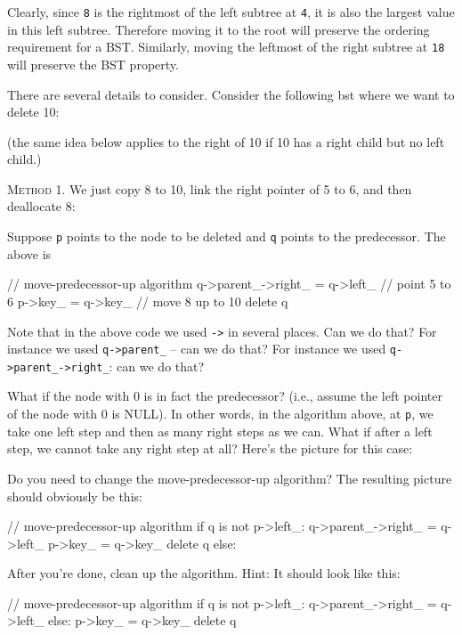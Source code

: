 Clearly, since \verb!8! is the rightmost of the 
left subtree at \verb!4!,
it is also the largest value in this left subtree.
Therefore moving it to the root
will preserve the ordering requirement for a BST.
Similarly, moving the leftmost of the right subtree at \verb!18!
will preserve the BST property.

There are several details to consider.
Consider the following bst where we want to delete 10:


(the same idea below applies to the right of 10 if 10
has a right child but no left child.)

\textsc{Method 1}.
We just copy 8 to 10, 
link the right pointer of 5 to 6, and then
deallocate 8:

Suppose \verb!p! points to the node to be deleted and
\verb!q! points to the predecessor.
The above is
\begin{console}
// move-predecessor-up algorithm
q->parent_->right_ = q->left_ // point 5 to 6
p->key_ = q->key_             // move 8 up to 10
delete q
\end{console}



\begin{ex}
  Note that in the above code we used \verb!->! in
  several places.
  Can we do that?
  For instance we used \verb!q->parent_! -- can we do that?
  For instance we used \verb!q->parent_->right_!: can we do that?
\end{ex}


\begin{ex}
What if the node with 0 is in fact the predecessor?
(i.e., assume the left pointer of the node with 0 is NULL).
In other words, in the algorithm above, at \verb!p!,
we take one left step and then as many right steps as we can.
What if after a left step, we cannot take any right step at all?
Here's the picture for this case:

Do you need to change the move-predecessor-up algorithm?
The resulting picture should obviously be this:

\begin{console}[commandchars=\\\{\}]
// move-predecessor-up algorithm
if q is not p->left_:
    q->parent_->right_ = q->left_ 
    p->key_ = q->key_             
    delete q
else:
\end{console}
After you're done, clean up the algorithm.
Hint: It should look like this:
\begin{console}[commandchars=\\\{\}]
// move-predecessor-up algorithm
if q is not p->left_:
    q->parent_->right_ = q->left_ 
else:
p->key_ = q->key_             
delete q
\end{console}

\end{ex}


